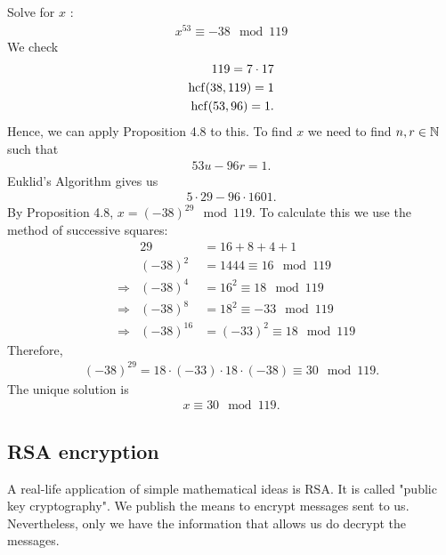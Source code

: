 \begin{ex}
	Solve for $x$ :
	\begin{align*}
	x^{53} \equiv -38 \mod 119
	\end{align*}
	We check
	\begin{align*}
	119 = 7 \cdot 17 \\
	\operatorname{hcf}(38,119) = 1 \\
	\operatorname{hcf}(53, 96) = 1.
	\end{align*}
	Hence, we can apply Proposition 4.8 to this.
	To find $x$ we need to find $n,r \in \mathbb N$ such that
	\begin{align*}
	53 u - 96 r = 1.
	\end{align*}
	Euklid's Algorithm gives us
	\begin{align*}
	5 \cdot 29 - 96 \cdot 1601 .
	\end{align*}
	By Proposition 4.8, $x = (-38)^{29} \mod 119$. To calculate this we use the method of successive squares:
	\begin{align*}
	& & 29 & = 16 +8+4+1 \\
	& & (-38)^2 & = 1444 \equiv 16 \mod 119 \\
	& \Rightarrow & (-38)^4 & = 16^2 \equiv 18 \mod 119 \\
	& \Rightarrow & (-38)^8 & = 18^2 \equiv -33 \mod 119 \\
	& \Rightarrow & (-38)^{16} & = (-33)^2 \equiv 18 \mod 119 
	\end{align*}
	Therefore,
	\begin{align*}
	(-38)^{29} = 18 \cdot (-33) \cdot 18 \cdot (-38) \equiv 30 \mod 119.
	\end{align*}
	The unique solution is 
	\begin{align*}
	x \equiv 30 \mod 119.
	\end{align*}
\end{ex}



\subsection{RSA encryption}

A real-life application of simple mathematical ideas is RSA. It is called "public key cryptography". We publish the means to encrypt messages sent to us. Nevertheless, only we have the information that allows us do decrypt the messages.

